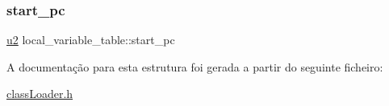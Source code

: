 \subsubsection{\texorpdfstring{start\+\_\+pc}{start\_pc}}
{\footnotesize\ttfamily \hyperlink{util_8h_a55ef8d87fd202b8417704c089899c5b9}{u2} local\+\_\+variable\+\_\+table\+::start\+\_\+pc}



A documentação para esta estrutura foi gerada a partir do seguinte ficheiro\+:\begin{DoxyCompactItemize}
\item 
\hyperlink{class_loader_8h}{class\+Loader.\+h}\end{DoxyCompactItemize}
